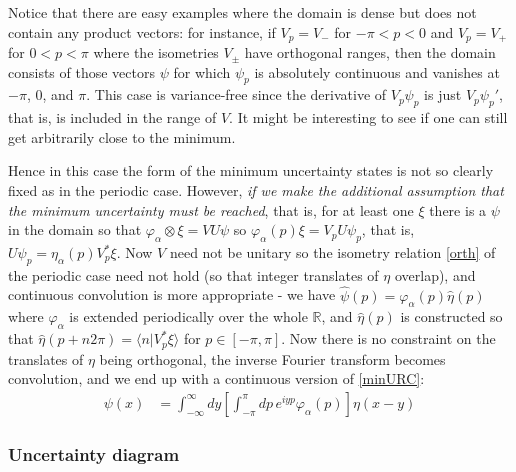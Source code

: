 Notice that there are easy examples where the domain is dense but does not contain any product vectors: for instance, if $V_p=V_-$ for $-\pi<p<0$ and $V_p=V_+$ for $0<p<\pi$ where the isometries $V_\pm$ have orthogonal ranges, then the domain consists of those vectors $\psi$ for which $\psi_p$ is absolutely continuous and vanishes at $-\pi$, $0$, and $\pi$. This case is variance-free since the derivative of $V_p\psi_p$ is just $V_p\psi_p'$, that is, is included in the range of $V$. It might be interesting to see if one can still get arbitrarily close to the minimum.

Hence in this case the form of the minimum uncertainty states is not so clearly fixed as in the periodic case. However, \emph{if we make the additional assumption that the minimum uncertainty must be reached}, that is, for at least one $\xi$ there is a $\psi$ in the domain so that $\varphi_\alpha\otimes\xi = VU\psi$ so $\varphi_\alpha(p) \xi = V_pU\psi_p$, that is, $U\psi_p= \eta_\alpha(p) V_p^*\xi$. Now $V$ need not be unitary so the isometry relation \eqref{orth} of the periodic case need not hold (so that integer translates of $\eta$ overlap), and continuous convolution is more appropriate - we have $\hat \psi(p) = \varphi_\alpha(p) \hat \eta(p)$ where $\varphi_\alpha$ is extended periodically over the whole $\mathbb R$, and $\hat \eta(p)$ is constructed so that $\hat\eta(p+n2\pi)= \langle n|V_p^*\xi\rangle$ for $p\in [-\pi,\pi]$. Now there is no constraint on the translates of $\eta$ being orthogonal, the inverse Fourier transform becomes convolution, and we end up with a continuous version of \eqref{minURC}:
\begin{align}\label{minUR2}
\psi(x) &= \int_{-\infty}^\infty dy\left[\int_{-\pi}^\pi dp \,e^{iyp}\varphi_\alpha(p)\right] \eta(x-y)
\end{align}

\subsubsection{Uncertainty diagram}


